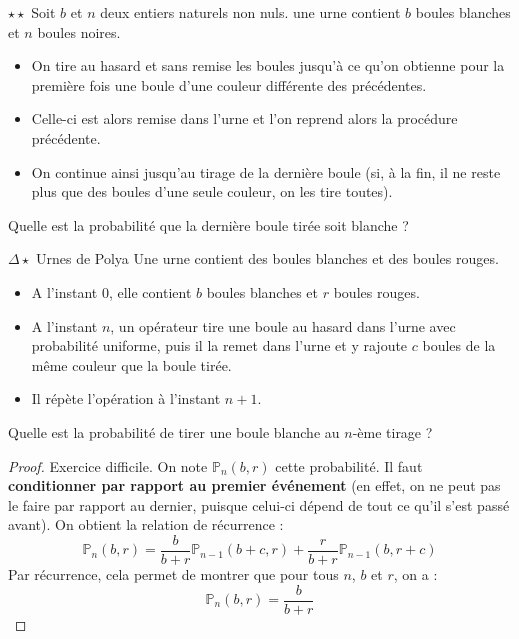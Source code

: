 \documentclass[french,a4paper]{article}
\renewcommand{\P}{\mathbb{P}}
\theoremstyle{plain}
\theoremstyle{definition}
\theoremstyle{remark}
\begin{document}
\begin{ex}[Moulin.16]{$\star\star$}
	Soit $b$ et $n$ deux entiers naturels non nuls. une urne contient $b$ boules blanches et $n$ boules noires.
	\begin{itemize}
		\item On tire au hasard et sans remise les boules jusqu'à ce qu'on obtienne pour la première fois une boule d'une couleur différente des précédentes.
		\item Celle-ci est alors remise dans l'urne et l'on reprend alors la procédure précédente.
		\item On continue ainsi jusqu'au tirage de la dernière boule (si, à la fin, il ne reste plus que des boules d'une seule couleur, on les tire toutes).
	\end{itemize}
	Quelle est la probabilité que la dernière boule tirée soit blanche ?
\end{ex}

\begin{ex}[Moulin.17]{$\Delta\star$ Urnes de Polya} Une urne contient des boules blanches et des boules rouges. 
	\begin{itemize}
		\item A l'instant $0$, elle contient $b$ boules blanches et $r$ boules rouges.
		\item A l'instant $n$, un opérateur tire une boule au hasard dans l'urne avec probabilité uniforme, puis il la remet dans l'urne et y rajoute $c$ boules de la même couleur que la boule tirée.
		\item Il répète l'opération à l'instant $n+1$.
	\end{itemize}Quelle est la probabilité de tirer une boule blanche au $n$-ème tirage ?
\end{ex}
\begin{proof}
	Exercice difficile. On note $\P_n(b,r)$ cette probabilité. Il faut \textbf{conditionner par rapport au premier événement} (en effet, on ne peut pas le faire par rapport au dernier, puisque celui-ci dépend de tout ce qu'il s'est passé avant). On obtient la relation de récurrence : $$\P_n(b,r)=\frac{b}{b+r}\P_{n-1}(b+c,r)+\frac{r}{b+r}\P_{n-1}(b,r+c)$$ Par récurrence, cela permet de montrer que pour tous $n$, $b$ et $r$, on a : $$\P_n(b,r)=\frac{b}{b+r}$$
\end{proof}
\end{document}
